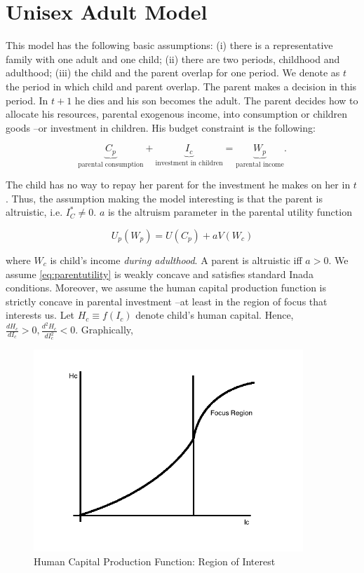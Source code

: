 \section{Unisex Adult Model} \label{sec:unisex}

\noindent This model has the following basic assumptions: (i) there is a representative family with one adult and one child; (ii) there are two periods, childhood and adulthood; (iii) the child and the parent overlap for one period. We denote as $t$ the period in which child and parent overlap. The parent makes a decision in this period. In $t+1$ he dies and his son becomes the adult.
\indent The parent decides how to allocate his resources, parental exogenous income, into consumption or children goods --or investment in children. His budget constraint is the following: 

\begin{equation}
\underbrace{C_{p}}_{\text{parental consumption}} + \underbrace{I_{c}}_{\text{investment in children}} = \underbrace{W_{p}}_{\text{parental income}}.
\end{equation}

\indent The child has no way to repay her parent for the investment he makes on her in $t$. Thus, the assumption making the model interesting is that the parent is altruistic, i.e. $I_{C}^* \neq 0$. $a$ is the altruism parameter in the parental utility function

\begin{equation}
U_{p} (W_{p}) = U(C_{p}) + a V (W_{c}) \label{eq:parentutility}
\end{equation}

\noindent where $W_{c}$ is child's income \textit{during adulthood}. A parent is altruistic iff $a > 0$. We assume  \eqref{eq:parentutility} is weakly concave and satisfies standard Inada conditions. Moreover, we assume the human capital production function is strictly concave in parental investment --at least in the region of focus that interests us. Let $H_{c} \equiv f(I_{c})$ denote child's human capital. Hence, $\frac{d H_{c}}{ d I_{c}} > 0, \frac{d^2 H_{c}}{ d I_{c}^2} < 0$. Graphically,

\begin{center}
\begin{figure}[H] 
\caption{Human Capital Production Function: Region of Interest}
\centering
\includegraphics[width=4in, height=3in]{Plots/FocusRegion.png}
\end{figure}
\end{center}

